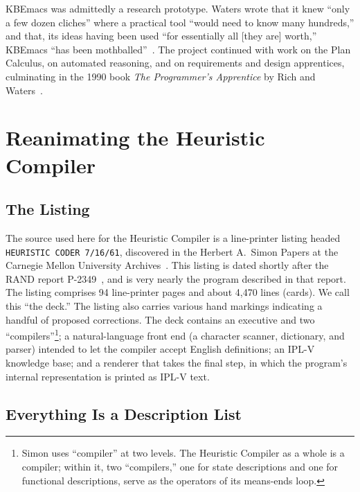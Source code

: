 \documentclass[11pt]{article}
\begin{document}
KBEmacs was admittedly a research prototype. Waters wrote that it knew
``only a few dozen cliches'' where a practical tool ``would need to
know many hundreds,'' and that, its ideas having been used ``for
essentially all [they are] worth,'' KBEmacs ``has been
mothballed''~\cite[pp.~54--55]{waters1986aimag}. The project continued
with work on the Plan Calculus, on automated reasoning, and on
requirements and design apprentices, culminating in the 1990 book
\textit{The Programmer's Apprentice} by Rich and
Waters~\cite{richwaters1990book}. 

\section{Reanimating the Heuristic Compiler}
\label{sec:hc}

\subsection{The Listing}

The source used here for the Heuristic Compiler is a line-printer
listing headed \texttt{HEURISTIC CODER 7/16/61}, discovered in the
Herbert A.~Simon Papers at the Carnegie Mellon University
Archives~\cite{simonlisting1961}. This listing is dated shortly after
the RAND report P-2349~\cite{simonP2349}, and is very nearly the
program described in that report. The listing comprises 94 line-printer
pages and about 4,470 lines (cards). We call this ``the deck.'' The
listing also carries various hand markings indicating a handful of
proposed corrections. The deck contains an executive and two
``compilers''\footnote{Simon uses ``compiler'' at two levels. The
Heuristic Compiler as a whole is a compiler; within it, two
``compilers,'' one for state descriptions and one for functional
descriptions, serve as the operators of its means-ends loop.}; a
natural-language front end (a character scanner, dictionary, and
parser) intended to let the compiler accept English definitions; an
IPL-V knowledge base; and a renderer that takes the final step, in
which the program's internal representation is printed as IPL-V text.

\subsection{Everything Is a Description List}
\end{document}
